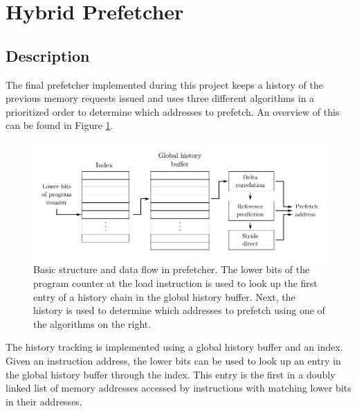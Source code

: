 \section{Hybrid Prefetcher}
\label{sec:prefetcher}
\subsection{Description}

The final prefetcher implemented during this project keeps a history of the
previous memory requests issued and uses three different algorithms in a
prioritized order to determine which addresses to prefetch.
An overview of this can be found in Figure \ref{fig:prefetcher}.

\begin{figure}[h]
	\centering
	\includegraphics{images/prefetcher.pdf}
	\caption{
		Basic structure and data flow in prefetcher. The lower bits of the
		program counter at the load instruction is used to look up the first
		entry of a history chain in the global history buffer. Next, the history
		is used to determine which addresses to prefetch using one of the
		algorithms on the right.
	}
	\label{fig:prefetcher}
\end{figure}

The history tracking is implemented using a global history buffer and an index.
Given an instruction address, the lower bits can be used to look up an entry in
the global history buffer through the index.
This entry is the first in a doubly linked list of memory addresses accessed by
instructions with matching lower bits in their addresses.

